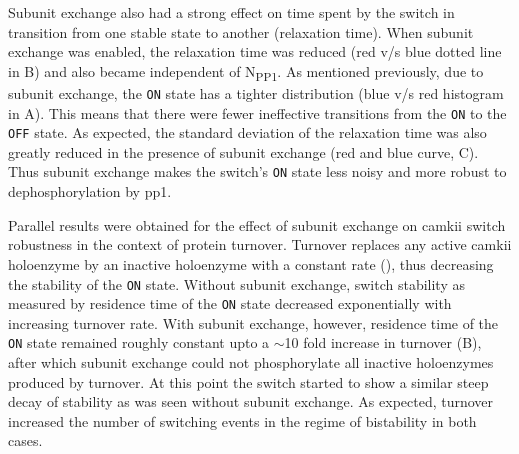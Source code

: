 \documentclass[9pt,lineno,doublespacing]{elife}
\newcommand\SUB[2]{#1\textsubscript{#2}}
\begin{document}
Subunit exchange also had a strong effect on time spent by the switch in
transition from one stable state to another (relaxation time). When subunit
exchange was enabled, the relaxation time was reduced (red v/s blue dotted line
in B) and also became independent of \SUB{N}{PP1}. As
mentioned previously, due to subunit exchange, the \texttt{ON} state has a
tighter distribution (blue v/s red histogram in A). This
means that there were fewer ineffective transitions from the \texttt{ON} to the
\texttt{OFF} state. As expected, the standard deviation of the relaxation time
was also greatly reduced in the presence of subunit exchange (red and blue
curve, C). Thus subunit exchange makes the switch's
\texttt{ON} state less noisy and more robust to dephosphorylation by \gls{pp1}.

Parallel results were obtained for the effect of subunit exchange on
\gls{camkii} switch robustness in the context of protein turnover. Turnover
replaces any active \gls{camkii} holoenzyme by an inactive holoenzyme with a
constant rate (), thus decreasing the stability of the \texttt{ON}
state. Without subunit exchange, switch stability as measured by residence time
of the \texttt{ON} state decreased exponentially with increasing turnover rate.
With subunit exchange, however, residence time of the \texttt{ON} state remained
roughly constant upto a $\sim$10 fold increase in turnover (B),
after which subunit exchange could not phosphorylate all inactive holoenzymes
produced by turnover. At this point the switch started to show a similar steep
decay of stability as was seen without subunit exchange. As expected, turnover
increased the number of switching events in the regime of bistability in both
cases.
\end{document}
